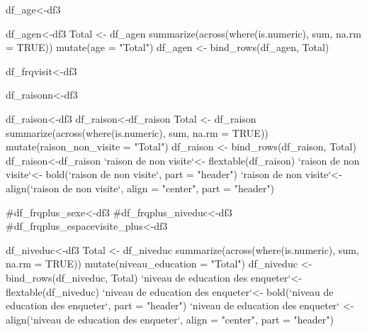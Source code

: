 df_age<-df3%

df_agen<-df3%
Total <- df_agen %
  summarize(across(where(is.numeric), sum, na.rm = TRUE)) %
  mutate(age = "Total")
df_agen <- bind_rows(df_agen, Total)

df_frqvisit<-df3%

df_raisonn<-df3%







df_raison<-df3%
df_raison<-df_raison%
Total <- df_raison %
  summarize(across(where(is.numeric), sum, na.rm = TRUE)) %
  mutate(raison_non_visite = "Total")
df_raison <- bind_rows(df_raison, Total)
df_raison<-df_raison%
`raison de non visite`<- flextable(df_raison)
`raison de non visite`<- bold(`raison de non visite`, part = "header")
`raison de non visite`<- align(`raison de non visite`, align = "center", part = "header")






#df_frqplus_sexe<-df3%
#df_frqplus_niveduc<-df3%
#df_frqplus_espacevisite_plus<-df3%






df_niveduc<-df3%
Total <- df_niveduc %
  summarize(across(where(is.numeric), sum, na.rm = TRUE)) %
  mutate(niveau_education = "Total")
df_niveduc <- bind_rows(df_niveduc, Total)
`niveau de education des enqueter`<- flextable(df_niveduc)
`niveau de education des enqueter`<- bold(`niveau de education des enqueter`, part = "header")
`niveau de education des enqueter` <- align(`niveau de education des enqueter`, align = "center", part = "header")





